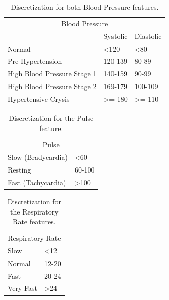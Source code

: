 \begin{table}[h]
	\begin{center}
		\begin{tabular}{lll}
			\multicolumn{3}{c}{Blood Pressure}                                  \\
			& Systolic          & Diastolic         \\
			Normal                      & \textless 120     & \textless 80      \\
			Pre-Hypertension            & 120-139           & 80-89             \\
			High Blood Pressure Stage 1 & 140-159           & 90-99             \\
			High Blood Pressure Stage 2 & 169-179           & 100-109           \\
			Hypertensive Crysis         & \textgreater= 180 & \textgreater= 110
		\end{tabular}
		\caption{Discretization for both Blood Pressure features.}
		\label{table:bp}
	\end{center}
\end{table}

\begin{table}[h]
	\begin{center}
		\begin{tabular}{ll}
			\multicolumn{2}{c}{Pulse}            \\
			Slow (Bradycardia) & \textless 60    \\
			Resting            & 60-100          \\
			Fast (Tachycardia) & \textgreater100
		\end{tabular}
		\caption{Discretization for the Pulse feature.}
		\label{table:pulse}
	\end{center}
\end{table}
 
\begin{table}[h]
	\begin{center}
		\begin{tabular}{ll}
			\multicolumn{2}{c}{Respiratory Rate} \\
			Slow           & \textless 12        \\
			Normal         & 12-20               \\
			Fast           & 20-24               \\
			Very Fast      & \textgreater24     
		\end{tabular}
		\caption{Discretization for the Respiratory Rate features.}
		\label{table:rr}
	\end{center}
\end{table}

